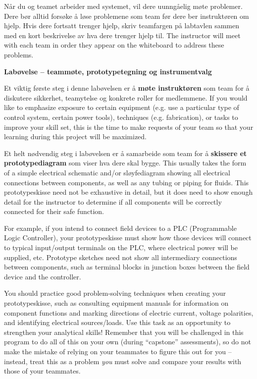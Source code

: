 Når du og teamet arbeider med systemet, vil dere uunngåelig møte problemer.  Dere bør alltid forsøke å løse problemene som team før dere ber instruktøren om hjelp.  Hvis dere fortsatt trenger hjelp, skriv teamfargen på labtavlen sammen med en kort beskrivelse av hva dere trenger hjelp til.  The instructor will meet with each team in order they appear on the whiteboard to address these problems.





\vfil \eject

\noindent
{\bf Labøvelse -- teammøte, prototypetegning og instrumentvalg}

\vskip 5pt

Et viktig første steg i denne labøvelsen er å {\bf møte instruktøren} som team for å diskutere sikkerhet, teamytelse og konkrete roller for medlemmene.  If you would like to emphasize exposure to certain equipment (e.g. use a particular type of control system, certain power tools), techniques (e.g. fabrication), or tasks to improve your skill set, this is the time to make requests of your team so that your learning during this project will be maximized.

\vskip 10pt

Et helt nødvendig steg i labøvelsen er å samarbeide som team for å {\bf skissere et prototypediagram} som viser hva dere skal bygge.  This usually takes the form of a simple electrical schematic and/or sløyfediagram showing all electrical connections between components, as well as any tubing or piping for fluids.  This prototypeskisse need not be exhaustive in detail, but it does need to show enough detail for the instructor to determine if all components will be correctly connected for their safe function.

For example, if you intend to connect field devices to a PLC (Programmable Logic Controller), your prototypeskisse must show how those devices will connect to typical input/output terminals on the PLC, where electrical power will be supplied, etc.  Prototype sketches need not show all intermediary connections between components, such as terminal blocks in junction boxes between the field device and the controller.

You should practice good problem-solving techniques when creating your prototypeskisse, such as consulting equipment manuals for information on component functions and marking directions of electric current, voltage polarities, and identifying electrical sources/loads.  Use this task as an opportunity to strengthen your analytical skills!  Remember that you will be challenged in this program to do all of this on your own (during ``capstone'' assessments), so do not make the mistake of relying on your teammates to figure this out for you -- instead, treat this as a problem {\it you} must solve and compare your results with those of your teammates.

